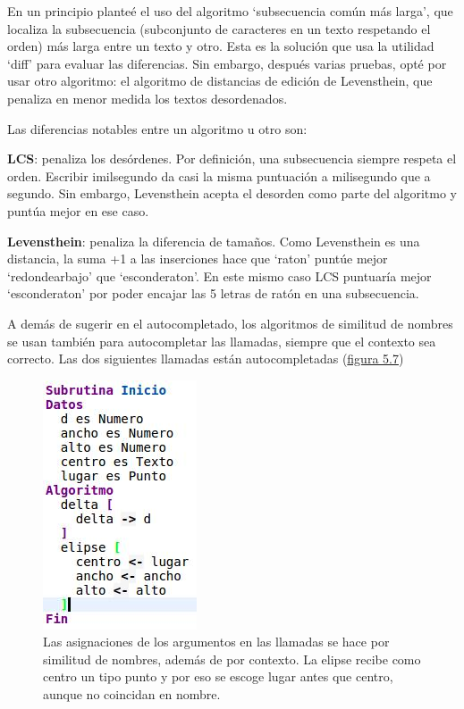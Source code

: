 \documentclass{report}
\begin{document}
	\vspace{10px}
	
	En un principio planteé el uso del algoritmo `subsecuencia común más larga'\cite{lcs}, que localiza la subsecuencia (subconjunto de caracteres en un texto respetando el orden) más larga entre un texto y otro. Esta es la solución que usa la utilidad `diff'\cite{diff} para evaluar las diferencias. Sin embargo, después varias pruebas, opté por usar otro algoritmo: el algoritmo de distancias de edición de Levensthein\cite{levensthein}, que penaliza en menor medida los textos desordenados.
	
	\vspace{10px}
	
	Las diferencias notables entre un algoritmo u otro son:
	
	\vspace{10px}
	
	\noindent
	\textbf{LCS}: penaliza los desórdenes. Por definición, una subsecuencia siempre respeta el orden. Escribir imilsegundo da casi la misma puntuación a milisegundo que a segundo. Sin embargo, Levensthein acepta el desorden como parte del algoritmo y puntúa mejor en ese caso.
	
	\vspace{10px}
	\noindent
	\textbf{Levensthein}: penaliza la diferencia de tamaños. Como Levensthein es una distancia, la suma +1 a las inserciones hace que `raton' puntúe mejor `redondearbajo' que `esconderaton'. En este mismo caso LCS puntuaría mejor `esconderaton' por poder encajar las 5 letras de ratón en una subsecuencia.
	
	\vspace{10px}
	
	A demás de sugerir en el autocompletado, los algoritmos de similitud de nombres se usan también para autocompletar las llamadas, siempre que el contexto sea correcto. Las dos siguientes llamadas están autocompletadas (\hyperref[fig:autocompletado2]{figura 5.7})
	
\begin{figure}
\centering
\includegraphics[width=0.4\linewidth]{autocompletado}
\caption[Autocompletado con filtro por tipos]{Las asignaciones de los argumentos en las llamadas se hace por similitud de nombres, además de por contexto. La elipse recibe como centro un tipo punto y por eso se escoge lugar antes que centro, aunque no coincidan en nombre.}
\label{fig:autocompletado2}
\end{figure}
\end{document}
